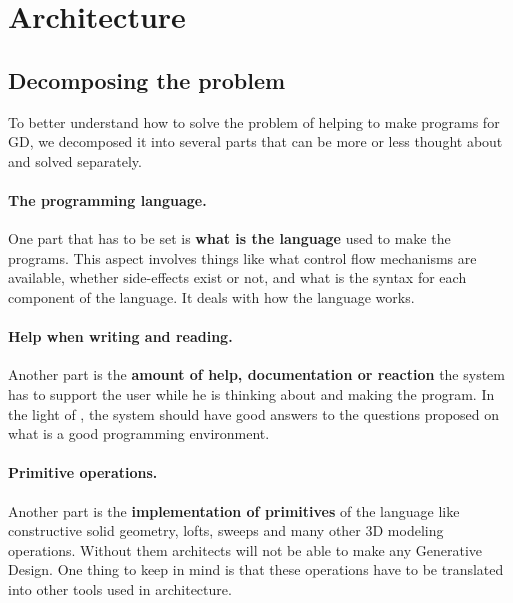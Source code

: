 \documentclass{./llncs2e/llncs}
\begin{document}


\section{Architecture}

\subsection{Decomposing the problem}
	To better understand how to solve the problem of helping to make programs for GD, we decomposed it into several parts that can be more or less thought about and solved separately.
	
	\paragraph{The programming language.}
	One part that has to be set is \textbf{what is the language} used to make the programs.
	This aspect involves things like what control flow mechanisms are available, whether side-effects exist or not, and what is the syntax for each component of the language.
	It deals with how the language works.

	\paragraph{Help when writing and reading.}
	Another part is the \textbf{amount of help, documentation or reaction} the system has to support the user while he is thinking about and making the program.
	In the light of \cite{victor2012learnable}, the system should have good answers to the questions proposed on what is a good programming environment.

	\paragraph{Primitive operations.}
	Another part is the \textbf{implementation of primitives} of the language like constructive solid geometry, lofts, sweeps and many other 3D modeling operations.
	Without them architects will not be able to make any Generative Design.
	One thing to keep in mind is that these operations have to be translated into other tools used in architecture.
\end{document}
